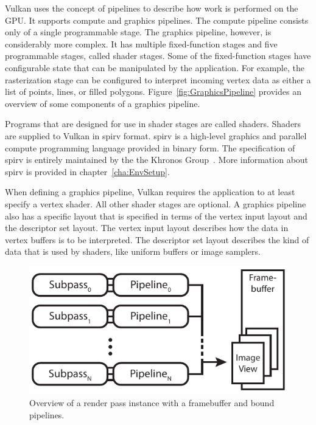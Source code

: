     Vulkan uses the concept of pipelines to describe how work is performed on the GPU.
    It supports compute and graphics pipelines.
    The compute pipeline consists only of a single programmable stage.
    The graphics pipeline, however, is considerably more complex.
    It has multiple fixed-function stages and five programmable stages, called shader stages.
    Some of the fixed-function stages have configurable state that can be manipulated by the \gls{application}.
    For example, the rasterization stage can be configured to interpret incoming vertex data as either a list of points, lines, or filled polygons.
    Figure~\ref{fig:GraphicsPipeline} provides an overview of some components of a graphics pipeline.

    Programs that are designed for use in shader stages are called shaders.
    Shaders are supplied to Vulkan in \gls{spirv} format.
    \gls{spirv} is a high-level graphics and parallel compute programming language provided in binary form.
    The specification of \gls{spirv} is entirely maintained by the the Khronos Group~\cite{spirvspecprov}.
    More information about \gls{spirv} is provided in chapter~\ref{cha:EnvSetup}.

    When defining a graphics pipeline, Vulkan requires the \gls{application} to at least specify a vertex shader.
    All other shader stages are optional.
    A graphics pipeline also has a specific layout that is specified in terms of the vertex input layout and the descriptor set layout.
    The vertex input layout describes how the data in vertex buffers is to be interpreted.
    The descriptor set layout describes the kind of data that is used by shaders, like uniform buffers or image samplers.


    \begin{figure}
      \centering
      \includegraphics[width=\textwidth]{Main/Images/RenderPassInstanceSample}
      \caption{Overview of a render pass instance with a framebuffer and bound pipelines.}
      \label{fig:RenderPassInstanceSample}
    \end{figure}

